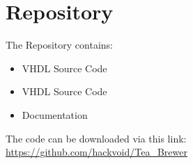 \documentclass{report}
\begin{document}
\chapter{Repository}

\Large
\vspace{1cm}
The Repository contains:
\vspace{1cm}
\begin{itemize}
	\item VHDL Source Code
	\item VHDL Source Code
	\item Documentation
\end{itemize}
\vspace{1cm}
The code can be downloaded via this link: \href{https://github.com/hackvoid/Tea_Brewer}{https://github.com/hackvoid/Tea\_Brewer}\\
\end{document}
